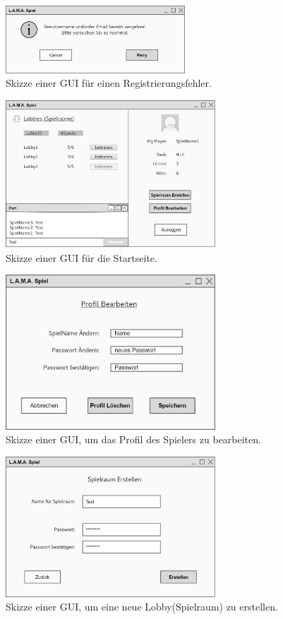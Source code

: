 \begin{figure}
	\centering
	\includegraphics[width=0.6\textwidth]{img/namevergeben}
	\caption{Skizze einer GUI für einen Registrierungsfehler.}
	\label{gui:warning2}
\end{figure}
\begin{figure}
	\centering
	\includegraphics[width=0.7\textwidth]{img/Startseite}
	\caption{Skizze einer GUI für die Startseite.}
	\label{gui:profil}
\end{figure}
\begin{figure}
	\centering
	\includegraphics[width=0.7\textwidth]{img/profilbear2}
	\caption{Skizze einer GUI, um das Profil des Spielers zu bearbeiten.}
	\label{gui:modifieprofil}
\end{figure}
\begin{figure}
	\centering
	\includegraphics[width=0.7\textwidth]{img/spielraumerstellen}
	\caption{Skizze einer GUI, um eine neue Lobby(Spielraum) zu erstellen.}
	\label{gui:spielraumerstellen}
\end{figure}
